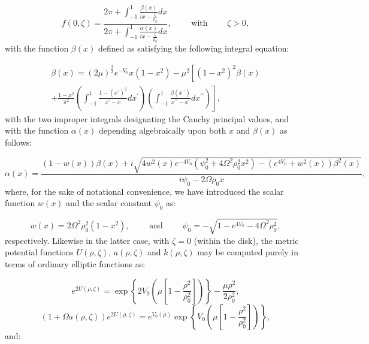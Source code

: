 \documentclass{article}
\begin{document}
\begin{equation}
f \left( 0, \zeta \right) = \frac{2 \pi + \int_{-1}^{1} \frac{\beta \left( x \right)}{i x - \frac{\zeta}{\rho_0}} dx}{2 \pi + \int_{-1}^{1} \frac{\alpha \left( x \right)}{i x - \frac{\zeta}{\rho_0}} dx}, \qquad \text{ with } \qquad \zeta > 0,
\end{equation}
with the function ${\beta \left( x \right)}$ defined as satisfying the following integral equation:

\begin{multline}
\beta \left( x \right) = \left( 2 \mu \right)^{\frac{3}{2}} e^{- V_0} x \left( 1 - x^2 \right) - \mu^2 \left[ \left( 1 - x^2 \right)^2 \beta \left( x \right) \right.\\
\left. + \frac{1 - x^2}{\pi^2} \left( \int_{-1}^{1} \frac{1 - \left( x^{\prime} \right)^2}{x^{\prime} - x} d x^{\prime} \right) \left( \int_{-1}^{1} \frac{\beta \left( x^{\prime \prime} \right)}{x^{\prime \prime} - x^{\prime}} d x^{\prime \prime} \right) \right],
\end{multline}
with the two improper integrals designating the Cauchy principal values, and with the function ${\alpha \left( x \right)}$ depending algebraically upon both $x$ and ${\beta \left( x \right)}$ as follows:

\begin{equation}
\alpha \left( x \right) = \frac{\left( 1 - w \left( x \right) \right) \beta \left( x \right) + i \sqrt{4 w^2 \left( x \right) e^{-4 V_0} \left( \psi_{0}^{2} + 4 \Omega^2 \rho_{0}^{2} x^2 \right) - \left( e^{4 V_0} + w^2 \left( x \right) \right) \beta^2 \left( x \right)}}{i \psi_0 - 2 \Omega \rho_0 x},
\end{equation}
where, for the sake of notational convenience, we have introduced the scalar function ${w \left( x \right)}$ and the scalar constant ${\psi_0}$ as:

\begin{equation}
w \left( x \right) = 2 \Omega^2 \rho_{0}^{2} \left( 1 - x^2 \right), \qquad \text{ and } \qquad \psi_0 = - \sqrt{1 - e^{4 V_0} - 4 \Omega^2 \rho_{0}^{2}},
\end{equation}
respectively. Likewise in the latter case, with ${\zeta = 0}$ (within the disk), the metric potential functions ${U \left( \rho, \zeta \right)}$, ${a \left( \rho, \zeta \right)}$ and ${k \left( \rho, \zeta \right)}$ may be computed purely in terms of ordinary elliptic functions as:

\begin{equation}
e^{2 U \left( \rho, \zeta \right)} = \exp \left\lbrace 2 V_0 \left( \mu \left[ 1 - \frac{\rho^2}{\rho_{0}^{2}} \right] \right) \right\rbrace - \frac{\mu \rho^2}{2 \rho_{0}^{2}},
\end{equation}
\begin{equation}
\left( 1 + \Omega a \left( \rho, \zeta \right) \right) e^{2 U \left( \rho, \zeta \right)} = e^{V_0 \left( \mu \right)} \exp \left\lbrace V_0 \left( \mu \left[ 1 - \frac{\rho^2}{\rho_{0}^{2}} \right] \right) \right\rbrace,
\end{equation}
and:
\end{document}
